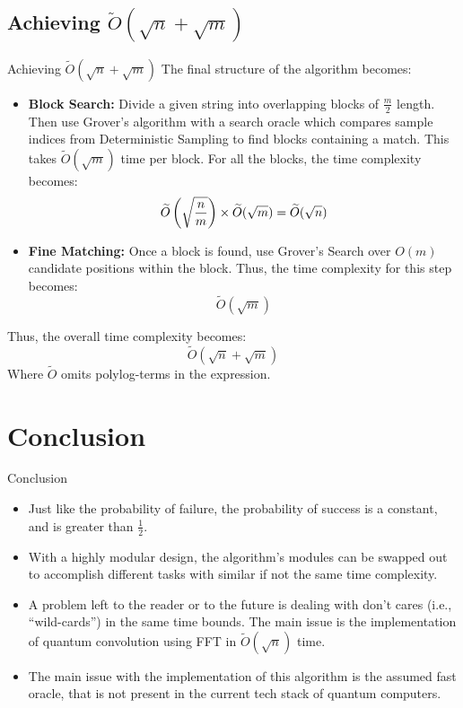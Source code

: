 \documentclass{beamer}
\begin{document}
\subsection{Achieving \texorpdfstring{$\widetilde{O}(\sqrt{n} + \sqrt{m})$}{O(sqrt(n)+sqrt(m))}}
\begin{frame}{Achieving \texorpdfstring{$\widetilde{O}(\sqrt{n} + \sqrt{m})$}{O(sqrt(n)+sqrt(m))}}
  The final structure of the algorithm becomes:
  \begin{itemize}
    \item \textbf{Block Search: }Divide a given string into overlapping blocks of $\frac{m}{2}$ length. Then use Grover's algorithm with a search oracle which compares sample indices from Deterministic Sampling to find blocks containing a match. This takes $\widetilde{O}(\sqrt{m})$ time per block. For all the blocks, the time complexity becomes:
          \[
            \widetilde{O} \left(\sqrt{n \over m}\right) \times \widetilde{O}(\sqrt{m}) = \widetilde{O}(\sqrt{n})
          \]
    \item \textbf{Fine Matching: }Once a block is found, use Grover's Search over $O(m)$ candidate positions within the block. Thus, the time complexity for this step becomes:
          \[
            \widetilde{O}(\sqrt{m})
          \]
  \end{itemize}
  Thus, the overall time complexity becomes:
  \[
    \widetilde{O}(\sqrt{n}+\sqrt{m})
  \]
  Where $\widetilde{O}$ omits polylog-terms in the expression.
\end{frame}


\section{Conclusion}
\begin{frame}{Conclusion}
  \begin{itemize}
    \item Just like the probability of failure, the probability of success is a constant, and is greater than $\frac12$.
    \item With a highly modular design, the algorithm's modules can be swapped out to accomplish different tasks with similar if not the same time complexity.
    \item A problem left to the reader or to the future is dealing with don't cares (i.e., ``wild-cards'') in the same time bounds. The main issue is the implementation of quantum convolution using FFT in $\widetilde{O}(\sqrt{n})$ time.
    \item The main issue with the implementation of this algorithm is the assumed fast oracle, that is not present in the current tech stack of quantum computers.
  \end{itemize}
\end{frame}
\end{document}
